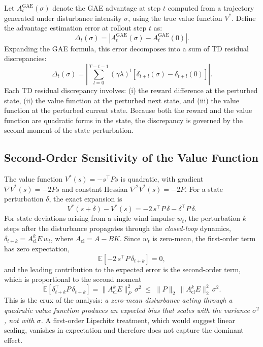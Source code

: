 \documentclass[10pt, conference]{IEEEtran}
\begin{document}
Let $A_t^{\text{GAE}}(\sigma)$ denote the GAE advantage at step $t$
computed from a trajectory generated under disturbance intensity
$\sigma$, using the true value function $V^*$. Define the advantage
estimation error at rollout step $t$ as:
\begin{equation}
  \Delta_t(\sigma) = \left|A_t^{\text{GAE}}(\sigma) -
  A_t^{\text{GAE}}(0)\right|.
\end{equation}
Expanding the GAE formula, this error decomposes into a sum of TD residual
discrepancies:
\begin{equation}
  \Delta_t(\sigma) = \left|\sum_{l=0}^{T-t-1}(\gamma\lambda)^l
  \left[\delta_{t+l}(\sigma) - \delta_{t+l}(0)\right]\right|.
\end{equation}
Each TD residual discrepancy involves: (i) the reward difference at the
perturbed state, (ii) the value function at the perturbed next state, and
(iii) the value function at the perturbed current state. Because both the
reward and the value function are quadratic forms in the state, the
discrepancy is governed by the second moment of the state perturbation.

\subsection{Second-Order Sensitivity of the Value Function}

The value function $V^*(s) = -s^\top P s$ is quadratic, with gradient
$\nabla V^*(s) = -2Ps$ and constant Hessian
$\nabla^2 V^*(s) = -2P$. For a state perturbation $\delta$, the exact
expansion is
\begin{equation}
  V^*(s+\delta) - V^*(s) = -2\,s^\top P\,\delta - \delta^\top P\,\delta.
\end{equation}
For state deviations arising from a single wind impulse $w_t$, the
perturbation $k$ steps after the disturbance propagates through the
\emph{closed-loop} dynamics, $\delta_{t+k} = A_{\mathrm{cl}}^{k}E\,w_t$,
where $A_{\mathrm{cl}} = A - BK$. Since $w_t$ is zero-mean, the
first-order term has zero expectation,
\begin{equation}
  \mathbb{E}\!\left[-2\,s^\top P\,\delta_{t+k}\right] = 0,
\end{equation}
and the leading contribution to the expected error is the second-order
term, which is proportional to the second moment
\begin{equation}
  \mathbb{E}\!\left[\delta_{t+k}^\top P\,\delta_{t+k}\right]
  = \big\|A_{\mathrm{cl}}^{k}E\big\|_P^2\,\sigma^2
  \;\le\; \|P\|_2\,\big\|A_{\mathrm{cl}}^{k}E\big\|_2^2\,\sigma^2 .
\end{equation}
This is the crux of the analysis: \emph{a zero-mean disturbance acting
through a quadratic value function produces an expected bias that scales
with the variance $\sigma^2$, not with $\sigma$.} A first-order Lipschitz
treatment, which would suggest linear scaling, vanishes in expectation
and therefore does not capture the dominant effect.
\end{document}
